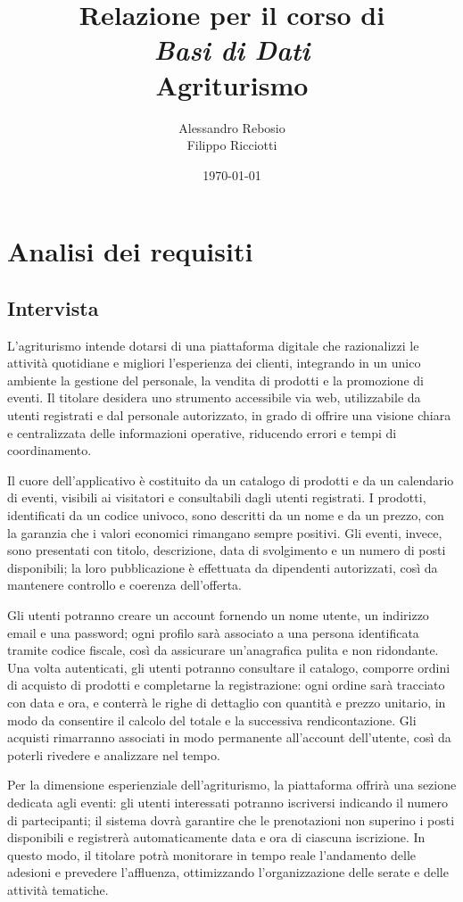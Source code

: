 \documentclass[a4paper,12pt]{report}
\title{
  \vspace*{2cm}
  \LARGE Relazione per il corso di \\[0.5cm]
  \textit{Basi di Dati} \\[2cm]
  \Huge\textbf{Agriturismo} \\[2cm]
}
\author{
  \Large
  Alessandro Rebosio \\
  Filippo Ricciotti
}
\date{
  \vspace{4cm}
  \today \\
}
\begin{document}
\maketitle

\tableofcontents

\chapter{Analisi dei requisiti}
\section{Intervista}

L'agriturismo intende dotarsi di una piattaforma digitale che
razionalizzi le attività quotidiane
e migliori l'esperienza dei clienti, integrando in un unico ambiente
la gestione del personale,
la vendita di prodotti e la promozione di eventi. Il titolare
desidera uno strumento accessibile
via web, utilizzabile da utenti registrati e dal personale
autorizzato, in grado di offrire una
visione chiara e centralizzata delle informazioni operative,
riducendo errori e tempi di
coordinamento.

Il cuore dell'applicativo è costituito da un catalogo di prodotti e
da un calendario di
eventi, visibili ai visitatori e consultabili dagli utenti
registrati. I prodotti, identificati
da un codice univoco, sono descritti da un nome e da un prezzo, con
la garanzia che i valori
economici rimangano sempre positivi. Gli eventi, invece, sono
presentati con titolo,
descrizione, data di svolgimento e un numero di posti disponibili; la
loro pubblicazione è
effettuata da dipendenti autorizzati, così da mantenere controllo e
coerenza dell'offerta.

Gli utenti potranno creare un account fornendo un nome utente, un
indirizzo email e una
password; ogni profilo sarà associato a una persona identificata
tramite codice fiscale,
così da assicurare un'anagrafica pulita e non ridondante. Una volta
autenticati, gli utenti
potranno consultare il catalogo, comporre ordini di acquisto di
prodotti e completarne la
registrazione: ogni ordine sarà tracciato con data e ora, e conterrà
le righe di dettaglio con
quantità e prezzo unitario, in modo da consentire il calcolo del
totale e la successiva
rendicontazione. Gli acquisti rimarranno associati in modo permanente
all'account dell'utente,
così da poterli rivedere e analizzare nel tempo.

Per la dimensione esperienziale dell'agriturismo, la piattaforma
offrirà una sezione dedicata
agli eventi: gli utenti interessati potranno iscriversi indicando il
numero di partecipanti; il
sistema dovrà garantire che le prenotazioni non superino i posti
disponibili e registrerà
automaticamente data e ora di ciascuna iscrizione. In questo modo, il
titolare potrà monitorare
in tempo reale l'andamento delle adesioni e prevedere l'affluenza,
ottimizzando l'organizzazione
delle serate e delle attività tematiche.
\end{document}
